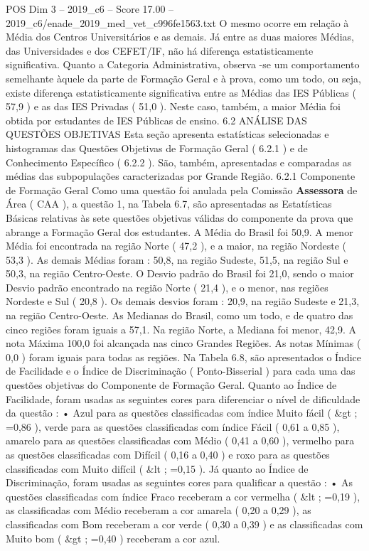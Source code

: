 \begin{textsample}{POS Dim 3 – 2019\_c6 – Score 17.00 – 2019\_c6/enade\_2019\_med\_vet\_c996fe1563.txt}
O mesmo ocorre em relação à Média dos Centros Universitários e as demais.
Já entre as duas maiores Médias, das Universidades e dos CEFET/IF, não há diferença estatisticamente significativa.
Quanto a Categoria Administrativa, observa -se um comportamento semelhante àquele da parte de Formação Geral e à prova, como um todo, ou seja, existe diferença estatisticamente significativa entre as Médias das IES Públicas ( 57,9 ) e as das IES Privadas ( 51,0 ).
Neste caso, também, a maior Média foi obtida por estudantes de IES Públicas de ensino. 6.2 ANÁLISE DAS QUESTÕES OBJETIVAS Esta seção apresenta estatísticas selecionadas e histogramas das Questões Objetivas de Formação Geral ( 6.2.1 ) e de Conhecimento Específico ( 6.2.2 ).
São, também, apresentadas e comparadas as médias das subpopulações caracterizadas por Grande Região. 6.2.1 Componente de Formação Geral Como uma questão foi anulada pela Comissão \textbf{Assessora} de Área ( CAA ), a questão 1, na Tabela 6.7, são apresentadas as Estatísticas Básicas relativas às sete questões objetivas válidas do componente da prova que abrange a Formação Geral dos estudantes.
A Média do Brasil foi 50,9.
A menor Média foi encontrada na região Norte ( 47,2 ), e a maior, na região Nordeste ( 53,3 ).
As demais Médias foram : 50,8, na região Sudeste, 51,5, na região Sul e 50,3, na região Centro-Oeste.
O Desvio padrão do Brasil foi 21,0, sendo o maior Desvio padrão encontrado na região Norte ( 21,4 ), e o menor, nas regiões Nordeste e Sul ( 20,8 ).
Os demais desvios foram : 20,9, na região Sudeste e 21,3, na região Centro-Oeste.
As Medianas do Brasil, como um todo, e de quatro das cinco regiões foram iguais a 57,1.
Na região Norte, a Mediana foi menor, 42,9.
A nota Máxima 100,0 foi alcançada nas cinco Grandes Regiões.
As notas Mínimas ( 0,0 ) foram iguais para todas as regiões.
Na Tabela 6.8, são apresentados o Índice de Facilidade e o Índice de Discriminação ( Ponto-Bisserial ) para cada uma das questões objetivas do Componente de Formação Geral.
Quanto ao Índice de Facilidade, foram usadas as seguintes cores para diferenciar o nível de dificuldade da questão : • Azul para as questões classificadas com índice Muito fácil ( \&gt ; =0,86 ), verde para as questões classificadas com índice Fácil ( 0,61 a 0,85 ), amarelo para as questões classificadas com Médio ( 0,41 a 0,60 ), vermelho para as questões classificadas com Difícil ( 0,16 a 0,40 ) e roxo para as questões classificadas com Muito difícil ( \&lt ; =0,15 ).
Já quanto ao Índice de Discriminação, foram usadas as seguintes cores para qualificar a questão : • As questões classificadas com índice Fraco receberam a cor vermelha ( \&lt ; =0,19 ), as classificadas com Médio receberam a cor amarela ( 0,20 a 0,29 ), as classificadas com Bom receberam a cor verde ( 0,30 a 0,39 ) e as classificadas com Muito bom ( \&gt ; =0,40 ) receberam a cor azul.

\end{textsample}
